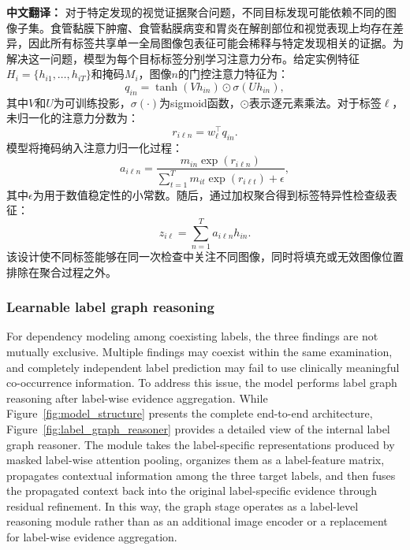 \documentclass[Afour,sagev,times]{sagej}
\begin{document}
\textbf{中文翻译：} 对于特定发现的视觉证据聚合问题，不同目标发现可能依赖不同的图像子集。食管黏膜下肿瘤、食管黏膜病变和胃炎在解剖部位和视觉表现上均存在差异，因此所有标签共享单一全局图像包表征可能会稀释与特定发现相关的证据。为解决这一问题，模型为每个目标标签分别学习注意力分布。给定实例特征$H_i=\{h_{i1},\ldots,h_{iT}\}$和掩码$M_i$，图像$n$的门控注意力特征为：
\begin{equation}
q_{in}=\tanh(Vh_{in})\odot\sigma(Uh_{in}),
\end{equation}
其中$V$和$U$为可训练投影，$\sigma(\cdot)$为sigmoid函数，$\odot$表示逐元素乘法。对于标签$\ell$，未归一化的注意力分数为：
\begin{equation}
r_{i\ell n}=w_{\ell}^{\top}q_{in}.
\end{equation}
模型将掩码纳入注意力归一化过程：
\begin{equation}
a_{i\ell n}=\frac{m_{in}\exp(r_{i\ell n})}{\sum_{t=1}^{T}m_{it}\exp(r_{i\ell t})+\epsilon},
\end{equation}
其中$\epsilon$为用于数值稳定性的小常数。随后，通过加权聚合得到标签特异性检查级表征：
\begin{equation}
z_{i\ell}=\sum_{n=1}^{T}a_{i\ell n}h_{in}.
\end{equation}
该设计使不同标签能够在同一次检查中关注不同图像，同时将填充或无效图像位置排除在聚合过程之外。

\subsubsection{Learnable label graph reasoning}
For dependency modeling among coexisting labels, the three findings are not mutually exclusive. Multiple findings may coexist within the same examination, and completely independent label prediction may fail to use clinically meaningful co-occurrence information. To address this issue, the model performs label graph reasoning after label-wise evidence aggregation. While Figure~\ref{fig:model_structure} presents the complete end-to-end architecture, Figure~\ref{fig:label_graph_reasoner} provides a detailed view of the internal label graph reasoner. The module takes the label-specific representations produced by masked label-wise attention pooling, organizes them as a label-feature matrix, propagates contextual information among the three target labels, and then fuses the propagated context back into the original label-specific evidence through residual refinement. In this way, the graph stage operates as a label-level reasoning module rather than as an additional image encoder or a replacement for label-wise evidence aggregation.
\end{document}
